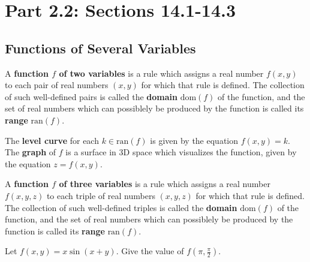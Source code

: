 \documentclass[letterpaper, twoside, 12pt]{book}
\begin{document}
\setcounter{chapter}{1}

\chapter{Part 2.2: Sections 14.1-14.3}

\setcounter{chapter}{14}
\setcounter{section}{0}

\section{Functions of Several Variables} %

\begin{definition}
  A \textbf{function $f$ of two variables} is a rule which assigns a
  real number $f(x,y)$ to each pair of real numbers $(x,y)$ for which
  that rule is defined.
  The collection of such well-defined pairs is called the
  \textbf{domain} $\text{dom}(f)$ of the function, and the set of
  real numbers which
  can possiblely be produced by the function is called its
  \textbf{range} $\text{ran}(f)$.
\end{definition}

\begin{definition}
  The \textbf{level curve} for each $k\in\text{ran}(f)$ is given by the
  equation $f(x,y)=k$.
  The \textbf{graph} of $f$ is a surface in 3D space which visualizes the function, given by the equation $z=f(x,y)$.
\end{definition}

\begin{definition}
  A \textbf{function $f$ of three variables} is a rule which assigns a
  real number $f(x,y,z)$ to each triple of real numbers $(x,y,z)$ for which
  that rule is defined.
  The collection of such well-defined triples is called the
  \textbf{domain} $\text{dom}(f)$ of the function, and the set of
  real numbers which
  can possiblely be produced by the function is called its
  \textbf{range} $\text{ran}(f)$.
\end{definition}

          \begin{problem}
            Let $f(x,y)=x\sin(x+y)$. Give the value of $f(\pi,\frac{\pi}{2})$.
          \end{problem}

          \begin{solution}

          \end{solution}
\end{document}
